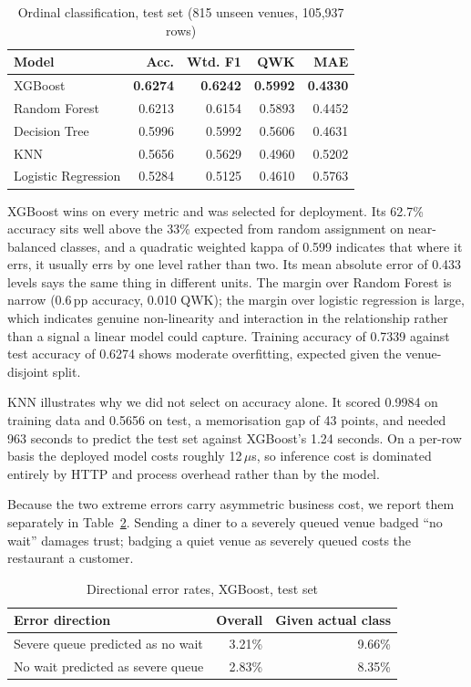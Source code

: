 \documentclass[conference]{IEEEtran}
\begin{document}
\begin{table}[htbp]
\caption{Ordinal classification, test set (815 unseen venues, 105{,}937 rows)}
\label{tab:models}
\centering
\setlength{\tabcolsep}{4pt}
\begin{tabular}{lrrrr}
\toprule
Model & Acc. & Wtd. F1 & QWK & MAE \\
\midrule
XGBoost & \textbf{0.6274} & \textbf{0.6242} & \textbf{0.5992} & \textbf{0.4330} \\
Random Forest & 0.6213 & 0.6154 & 0.5893 & 0.4452 \\
Decision Tree & 0.5996 & 0.5992 & 0.5606 & 0.4631 \\
KNN & 0.5656 & 0.5629 & 0.4960 & 0.5202 \\
Logistic Regression & 0.5284 & 0.5125 & 0.4610 & 0.5763 \\
\bottomrule
\end{tabular}
\end{table}

XGBoost wins on every metric and was selected for deployment. Its 62.7\% accuracy sits well above the 33\% expected from random assignment on near-balanced classes, and a quadratic weighted kappa of 0.599 indicates that where it errs, it usually errs by one level rather than two. Its mean absolute error of 0.433 levels says the same thing in different units. The margin over Random Forest is narrow (0.6\,pp accuracy, 0.010 QWK); the margin over logistic regression is large, which indicates genuine non-linearity and interaction in the relationship rather than a signal a linear model could capture. Training accuracy of 0.7339 against test accuracy of 0.6274 shows moderate overfitting, expected given the venue-disjoint split.

KNN illustrates why we did not select on accuracy alone. It scored 0.9984 on training data and 0.5656 on test, a memorisation gap of 43 points, and needed 963 seconds to predict the test set against XGBoost's 1.24 seconds. On a per-row basis the deployed model costs roughly 12\,$\mu$s, so inference cost is dominated entirely by HTTP and process overhead rather than by the model.

Because the two extreme errors carry asymmetric business cost, we report them separately in Table~\ref{tab:critical}. Sending a diner to a severely queued venue badged ``no wait'' damages trust; badging a quiet venue as severely queued costs the restaurant a customer.

\begin{table}[htbp]
\caption{Directional error rates, XGBoost, test set}
\label{tab:critical}
\centering
\begin{tabular}{lrr}
\toprule
Error direction & Overall & Given actual class \\
\midrule
Severe queue predicted as no wait & 3.21\% & 9.66\% \\
No wait predicted as severe queue & 2.83\% & 8.35\% \\
\bottomrule
\end{tabular}
\end{table}
\end{document}
